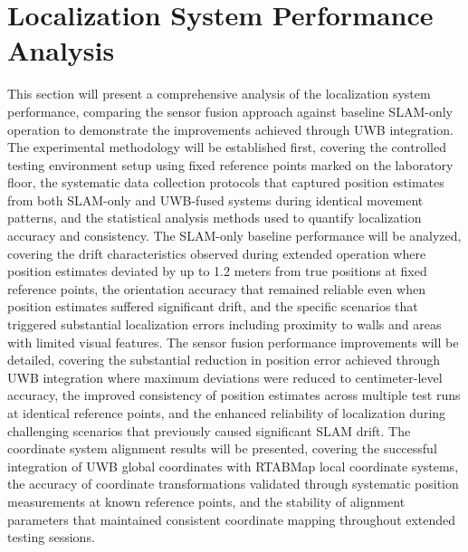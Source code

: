 \section{Localization System Performance Analysis}
This section will present a comprehensive analysis of the localization system performance, comparing the sensor fusion approach against baseline SLAM-only operation to demonstrate the improvements achieved through UWB integration. The experimental methodology will be established first, covering the controlled testing environment setup using fixed reference points marked on the laboratory floor, the systematic data collection protocols that captured position estimates from both SLAM-only and UWB-fused systems during identical movement patterns, and the statistical analysis methods used to quantify localization accuracy and consistency. The SLAM-only baseline performance will be analyzed, covering the drift characteristics observed during extended operation where position estimates deviated by up to 1.2 meters from true positions at fixed reference points, the orientation accuracy that remained reliable even when position estimates suffered significant drift, and the specific scenarios that triggered substantial localization errors including proximity to walls and areas with limited visual features. The sensor fusion performance improvements will be detailed, covering the substantial reduction in position error achieved through UWB integration where maximum deviations were reduced to centimeter-level accuracy, the improved consistency of position estimates across multiple test runs at identical reference points, and the enhanced reliability of localization during challenging scenarios that previously caused significant SLAM drift. The coordinate system alignment results will be presented, covering the successful integration of UWB global coordinates with RTABMap local coordinate systems, the accuracy of coordinate transformations validated through systematic position measurements at known reference points, and the stability of alignment parameters that maintained consistent coordinate mapping throughout extended testing sessions.

